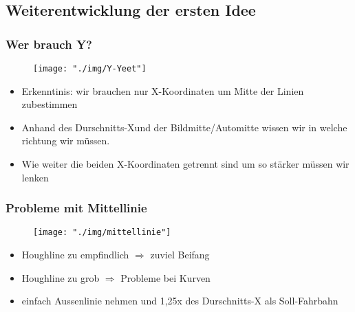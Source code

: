 \documentclass{beamer}
\begin{document}
\subsection{Weiterentwicklung der ersten Idee}

\begin{frame}

\frametitle{Wer brauch Y?}

\begin{center}
\begin{figure}[h]
\centering
\texttt{[image: "./img/Y-Yeet"]}

\label{fig:Weg mit dem Y}
\end{figure}
\end{center}

\begin{itemize}
\item Erkenntinis: wir brauchen nur X-Koordinaten um Mitte der Linien zubestimmen
\item Anhand des \glqq Durschnitts-X\grqq  und der Bildmitte/Automitte wissen wir in welche richtung wir müssen. 
\item Wie weiter die beiden X-Koordinaten getrennt sind um so stärker müssen wir lenken 
\end{itemize}

\end{frame}

\begin{frame}

\frametitle{Probleme mit Mittellinie}

\begin{center}
\begin{figure}[h]
\centering
\texttt{[image: "./img/mittellinie"]}
\label{fig:Mittellinie}
\end{figure}
\end{center}

\begin{itemize}
\item Houghline zu empfindlich $\Rightarrow$ zuviel \glqq Beifang\grqq 
\item Houghline zu grob $\Rightarrow$ Probleme bei Kurven
\item einfach Aussenlinie nehmen und 1,25x des Durschnitts-X als Soll-Fahrbahn
\end{itemize}

\end{frame}
\end{document}

